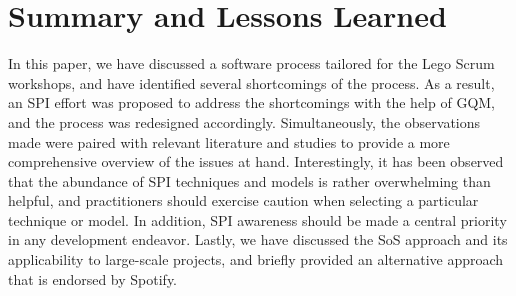 \documentclass[conference]{IEEEtran}
\begin{document}
\section{Summary and Lessons Learned}
\label{sec:summary}
In this paper, we have discussed a software process tailored for the Lego Scrum
workshops, and have identified several shortcomings of the process. As a
result, an SPI effort was proposed to address the shortcomings with the help of
GQM, and the process was redesigned accordingly. Simultaneously, the
observations made were paired with relevant literature and studies to provide a
more comprehensive overview of the issues at hand. Interestingly, it has been
observed that the abundance of SPI techniques and models is rather overwhelming
than helpful, and practitioners should exercise caution when selecting a
particular technique or model. In addition, SPI awareness should be made a
central priority in any development endeavor. Lastly, we have discussed the SoS
approach and its applicability to large-scale projects, and briefly provided an
alternative approach that is endorsed by Spotify.


\end{document}
